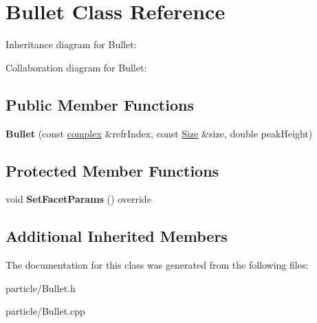 \hypertarget{class_bullet}{}\section{Bullet Class Reference}
\label{class_bullet}


Inheritance diagram for Bullet\+:


Collaboration diagram for Bullet\+:
\subsection*{Public Member Functions}
\begin{DoxyCompactItemize}
\item 
\mbox{\label{class_bullet_a5bcdbed105749412de2da8f7ed0331fa}} 
{\bfseries Bullet} (const \mbox{\hyperlink{classcomplex}{complex}} \&refr\+Index, const \mbox{\hyperlink{struct_size}{Size}} \&size, double peak\+Height)
\end{DoxyCompactItemize}
\subsection*{Protected Member Functions}
\begin{DoxyCompactItemize}
\item 
\mbox{\label{class_bullet_a5a6567716e528cebd8718dd728f5f85c}} 
void {\bfseries Set\+Facet\+Params} () override
\end{DoxyCompactItemize}
\subsection*{Additional Inherited Members}


The documentation for this class was generated from the following files\+:\begin{DoxyCompactItemize}
\item 
particle/Bullet.\+h\item 
particle/Bullet.\+cpp\end{DoxyCompactItemize}
